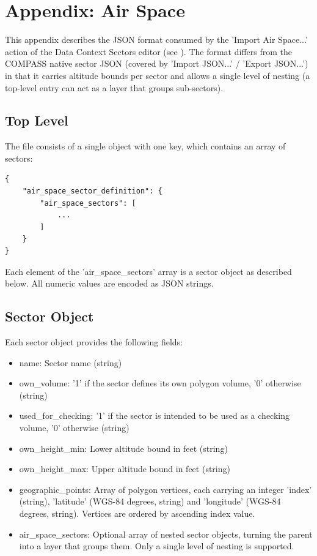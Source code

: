 \section{Appendix: Air Space}
\label{sec:appendix_airspace}

This appendix describes the JSON format consumed by the 'Import Air Space...' action of the Data Context Sectors editor (see ). The format differs from the COMPASS native sector JSON (covered by 'Import JSON...' / 'Export JSON...') in that it carries altitude bounds per sector and allows a single level of nesting (a top-level entry can act as a layer that groups sub-sectors). \\

\subsection{Top Level}

The file consists of a single object with one key, which contains an array of sectors:

\begin{lstlisting}
{
    "air_space_sector_definition": {
        "air_space_sectors": [
            ...
        ]
    }
}
\end{lstlisting}

Each element of the 'air\_space\_sectors' array is a sector object as described below. All numeric values are encoded as JSON strings. \\

\subsection{Sector Object}

Each sector object provides the following fields:

\begin{itemize}
\item name: Sector name (string)
\item own\_volume: '1' if the sector defines its own polygon volume, '0' otherwise (string)
\item used\_for\_checking: '1' if the sector is intended to be used as a checking volume, '0' otherwise (string)
\item own\_height\_min: Lower altitude bound in feet (string)
\item own\_height\_max: Upper altitude bound in feet (string)
\item geographic\_points: Array of polygon vertices, each carrying an integer 'index' (string), 'latitude' (WGS-84 degrees, string) and 'longitude' (WGS-84 degrees, string). Vertices are ordered by ascending index value.
\item air\_space\_sectors: Optional array of nested sector objects, turning the parent into a layer that groups them. Only a single level of nesting is supported.
\end{itemize}
\ \\

